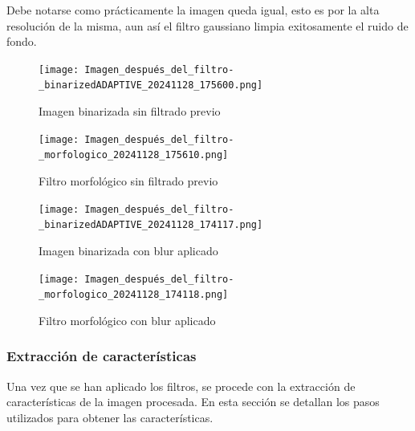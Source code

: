 \documentclass[12pt,a4paper]{article}
\begin{document}
 Debe notarse como prácticamente la imagen queda igual, esto es por la alta resolución de la misma, aun así el filtro gaussiano limpia exitosamente el ruido de fondo.
\begin{figure}[htbp]
    \centering
    \begin{minipage}{0.43\textwidth}
        \centering
        \texttt{[image: Imagen\_después\_del\_filtro-\_binarizedADAPTIVE\_20241128\_175600.png]}  %
        \caption{Imagen binarizada sin filtrado previo}
    \end{minipage}\hfill
    \begin{minipage}{0.43\textwidth}
        \centering
        \texttt{[image: Imagen\_después\_del\_filtro-\_morfologico\_20241128\_175610.png]}  %
        \caption{Filtro morfológico sin filtrado previo}
    \end{minipage}
    \centering
    \begin{minipage}{0.43\textwidth}
        \centering
        \texttt{[image: Imagen\_después\_del\_filtro-\_binarizedADAPTIVE\_20241128\_174117.png]}  %
        \caption{Imagen binarizada con blur aplicado}
    \end{minipage}\hfill
    \begin{minipage}{0.43\textwidth}
        \centering
        \texttt{[image: Imagen\_después\_del\_filtro-\_morfologico\_20241128\_174118.png]}  %
        \caption{Filtro morfológico con blur aplicado}
    \end{minipage}
\end{figure}
\newpage
\subsubsection*{Extracción de características}

Una vez que se han aplicado los filtros, se procede con la extracción de características de la imagen procesada. En esta sección se detallan los pasos utilizados para obtener las características.
\end{document}
